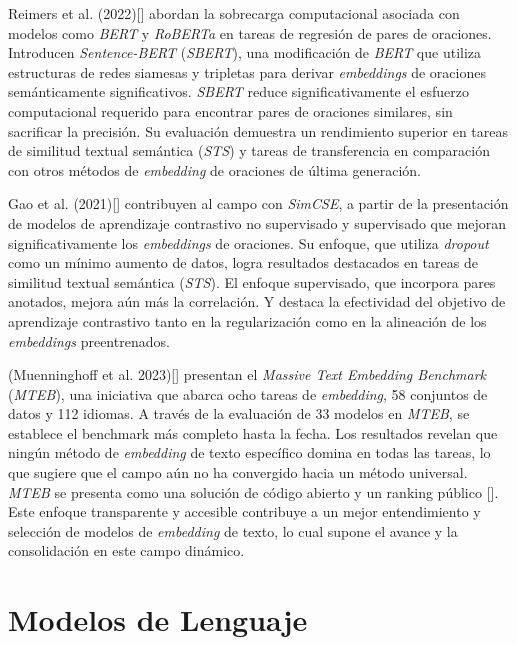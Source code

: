     Reimers et al. (2022)[\cite{reimers2019sentencebert}] abordan la sobrecarga computacional asociada con modelos como \emph{BERT} y \emph{RoBERTa} en tareas de regresión de pares de oraciones. Introducen \emph{Sentence-BERT} (\emph{SBERT}), una modificación de \emph{BERT} que utiliza estructuras de redes siamesas y tripletas para derivar \emph{embeddings} de oraciones semánticamente significativos. \emph{SBERT} reduce significativamente el esfuerzo computacional requerido para encontrar pares de oraciones similares, sin sacrificar la precisión. Su evaluación demuestra un rendimiento superior en tareas de similitud textual semántica (\emph{STS}) y tareas de transferencia en comparación con otros métodos de \emph{embedding} de oraciones de última generación.

    Gao et al. (2021)[\cite{gao2022simcse}] contribuyen al campo con \emph{SimCSE}, a partir de la presentación de modelos de aprendizaje contrastivo no supervisado y supervisado que mejoran significativamente los \emph{embeddings} de oraciones. Su enfoque, que utiliza \emph{dropout} como un mínimo aumento de datos, logra resultados destacados en tareas de similitud textual semántica (\emph{STS}). El enfoque supervisado, que incorpora pares anotados, mejora aún más la correlación. Y destaca la efectividad del objetivo de aprendizaje contrastivo tanto en la regularización como en la alineación de los \emph{embeddings} preentrenados.

    (Muenninghoff et al. 2023)[\cite{muennighoff2023mteb}] presentan el \emph{Massive Text Embedding Benchmark} (\emph{MTEB}), una iniciativa que abarca ocho tareas de \emph{embedding}, 58 conjuntos de datos y 112 idiomas. A través de la evaluación de 33 modelos en \emph{MTEB}, se establece el benchmark más completo hasta la fecha. Los resultados revelan que ningún método de \emph{embedding} de texto específico domina en todas las tareas, lo que sugiere que el campo aún no ha convergido hacia un método universal. \emph{MTEB} se presenta como una solución de código abierto y un ranking público [\cite{leaderboard}]. Este enfoque transparente y accesible contribuye a un mejor entendimiento y selección de modelos de \emph{embedding} de texto, lo cual supone el avance y la consolidación en este campo dinámico.

\section{Modelos de Lenguaje}
   
